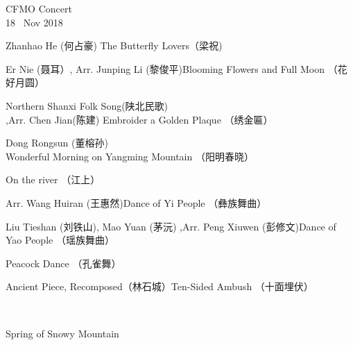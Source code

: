 \documentclass[letter,6pt,poets]{ConcProg}
\begin{document}
\begin{programme}{
    CFMO Concert
\\  {\normalsize 18 ~Nov 2018}
}
  \begin{part}[]
    \begin{composition}{Zhanhao He (何占豪) }{}{The Butterfly Lovers（梁祝)}{}
    \end{composition}
    
    \begin{composition}{Er Nie (聂耳）, Arr. Junping Li (黎俊平)}{}{Blooming Flowers and Full Moon （花好月圆）}{}      
    \end{composition}
    
    \begin{composition}{Northern Shanxi Folk Song(陕北民歌)\\,Arr. Chen Jian(陈建)} {}{Embroider a Golden Plaque  （绣金匾）}{}
    \end{composition}
    \begin{composition}{Dong Rongsun (董榕孙)} {}{Wonderful Morning on Yangming Mountain  （阳明春晓）
}{}
    \end{composition}
    \begin{composition}{} {}{On the river  （江上）}{}
    \end{composition}
    \begin{composition}{Arr. Wang Huiran (王惠然)}{}{Dance of Yi People  （彝族舞曲）}{}
    \end{composition}
    \begin{composition}{Liu Tieshan (刘铁山), Mao Yuan (茅沅) ,Arr. Peng Xiuwen (彭修文)}{}{Dance of Yao People  （瑶族舞曲）}{}
    \end{composition}
    \begin{composition}{}{}{Peacock Dance  （孔雀舞） }{}
    \end{composition}
    \begin{composition}{Ancient Piece, Recomposed（林石城）}{}{Ten-Sided Ambush  （十面埋伏）}{}
    \end{composition}\\
    \begin{composition}{}{}{Spring of Snowy Mountain   }{}

\end{composition}
\end{part}
\end{programme}
\end{document}
